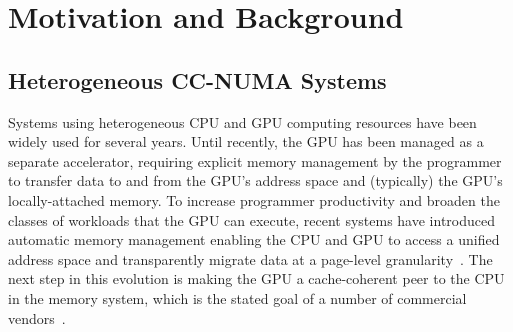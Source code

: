 \section{Motivation and Background}
\label{background}

\subsection{{Heterogeneous CC-NUMA Systems}}
\label{heterogeneous_background}
Systems using heterogeneous CPU and GPU computing resources
have been widely used for several years.  Until recently, the GPU 
has been managed as a separate accelerator, requiring 
explicit memory management by the programmer to transfer data to and 
from the GPU's address space and (typically) the GPU's locally-attached
memory.  To increase programmer productivity and broaden the classes
of workloads that the GPU can execute, recent systems have introduced
automatic memory management enabling the CPU and GPU to access a unified
address space and transparently migrate data at a page-level 
granularity~\cite{UVM}.
The next step in this evolution is making the GPU a cache-coherent peer
to the CPU in the memory system, which is the stated goal of a number
of commercial vendors~\cite{HSA}.

